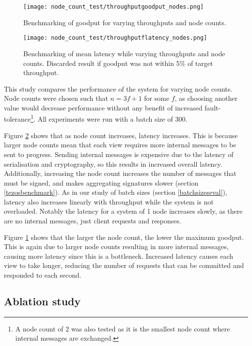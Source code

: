\begin{figure}[h!]
\centering
\texttt{[image: node\_count\_test/throughputgoodput\_nodes.png]}
\caption{Benchmarking of goodput for varying throughputs and node counts.}
\label{throughputgoodputnodes}
\end{figure}

\begin{figure}[h!]
\centering
\texttt{[image: node\_count\_test/throughputflatency\_nodes.png]}
\caption{Benchmarking of mean latency while varying throughputs and node counts. Discarded result if goodput was not within 5\% of target throughput.}
\label{throughputlatencynodes}
\end{figure}

This study compares the performance of the system for varying node counts. Node counts were chosen such that $n = 3f + 1$ for some $f$, as choosing another value would decrease performance without any benefit of increased fault-tolerance\footnote{A node count of 2 was also tested as it is the smallest node count where internal messages are exchanged.}. All experiments were run with a batch size of 300.

Figure \ref{throughputlatencynodes} shows that as node count increases, latency increases. This is because larger node counts mean that each view requires more internal messages to be sent to progress. Sending internal messages is expensive due to the latency of serialisation and cryptography, so this results in increased overall latency. Additionally, increasing the node count increases the number of messages that must be signed, and makes aggregating signatures slower (section \ref{tezosbenchmark}). As in our study of batch sizes (section \ref{batchsizeseval}), latency also increases linearly with throughput while the system is not overloaded. Notably the latency for a system of 1 node increases slowly, as there are no internal messages, just client requests and responses.

Figure \ref{throughputgoodputnodes} shows that the larger the node count, the lower the maximum goodput. This is again due to larger node counts resulting in more internal messages, causing more latency since this is a bottleneck. Increased latency causes each view to take longer, reducing the number of requests that can be committed and responded to each second.

\subsection{Ablation study} \label{ablation}

